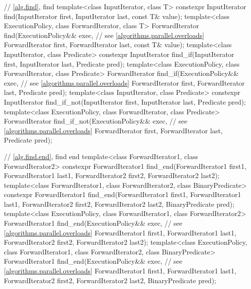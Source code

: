 \begin{codeblock}
{  // \ref{alg.find}, find
  template<class InputIterator, class T>
    constexpr InputIterator find(InputIterator first, InputIterator last,
                                 const T& value);
  template<class ExecutionPolicy, class ForwardIterator, class T>
    ForwardIterator find(ExecutionPolicy&& exec, // see \ref{algorithms.parallel.overloads}
                         ForwardIterator first, ForwardIterator last,
                         const T& value);
  template<class InputIterator, class Predicate>
    constexpr InputIterator find_if(InputIterator first, InputIterator last,
                                    Predicate pred);
  template<class ExecutionPolicy, class ForwardIterator, class Predicate>
    ForwardIterator find_if(ExecutionPolicy&& exec, // see \ref{algorithms.parallel.overloads}
                            ForwardIterator first, ForwardIterator last,
                            Predicate pred);
  template<class InputIterator, class Predicate>
    constexpr InputIterator find_if_not(InputIterator first, InputIterator last,
                                        Predicate pred);
  template<class ExecutionPolicy, class ForwardIterator, class Predicate>
    ForwardIterator find_if_not(ExecutionPolicy&& exec, // see \ref{algorithms.parallel.overloads}
                                ForwardIterator first, ForwardIterator last,
                                Predicate pred);

  // \ref{alg.find.end}, find end
  template<class ForwardIterator1, class ForwardIterator2>
    constexpr ForwardIterator1
      find_end(ForwardIterator1 first1, ForwardIterator1 last1,
               ForwardIterator2 first2, ForwardIterator2 last2);
  template<class ForwardIterator1, class ForwardIterator2, class BinaryPredicate>
    constexpr ForwardIterator1
      find_end(ForwardIterator1 first1, ForwardIterator1 last1,
               ForwardIterator2 first2, ForwardIterator2 last2,
               BinaryPredicate pred);
  template<class ExecutionPolicy, class ForwardIterator1, class ForwardIterator2>
    ForwardIterator1
      find_end(ExecutionPolicy&& exec, // see \ref{algorithms.parallel.overloads}
               ForwardIterator1 first1, ForwardIterator1 last1,
               ForwardIterator2 first2, ForwardIterator2 last2);
  template<class ExecutionPolicy, class ForwardIterator1,
           class ForwardIterator2, class BinaryPredicate>
    ForwardIterator1
      find_end(ExecutionPolicy&& exec, // see \ref{algorithms.parallel.overloads}
               ForwardIterator1 first1, ForwardIterator1 last1,
               ForwardIterator2 first2, ForwardIterator2 last2,
               BinaryPredicate pred);

}
\end{codeblock}
